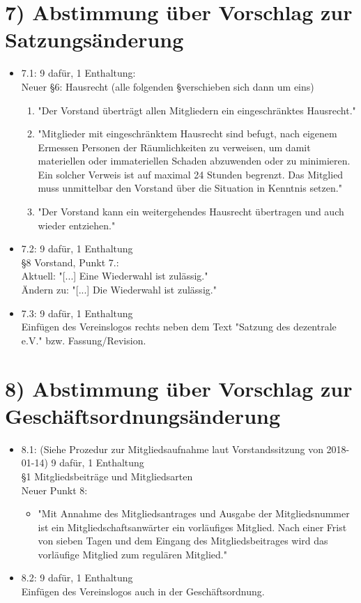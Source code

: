 \documentclass[10pt,a4paper]{scrartcl}
\begin{document}
\section*{7) Abstimmung {\"u}ber Vorschlag zur Satzungs{\"a}nderung}
    	\begin{itemize}
    		\item 7.1: 9 daf{\"u}r, 1 Enthaltung:\\
			Neuer \S6: Hausrecht (alle folgenden \S verschieben sich
			dann um eins)
		    	\begin{enumerate}
				\item "Der Vorstand übertr{\"a}gt allen Mitgliedern ein
					eingeschr{\"a}nktes Hausrecht."
				\item "Mitglieder mit eingeschr{\"a}nktem Hausrecht sind
					befugt, nach eigenem Ermessen Personen der
					R{\"a}umlichkeiten zu verweisen, um damit materiellen
					oder immateriellen Schaden abzuwenden oder zu
					minimieren. Ein solcher Verweis ist auf maximal 24
					Stunden begrenzt. Das Mitglied muss unmittelbar
					den Vorstand {\"u}ber die Situation in Kenntnis setzen."
				\item "Der Vorstand kann ein weitergehendes Hausrecht
					{\"u}bertragen und auch wieder entziehen."
			\end{enumerate}
    		\item 7.2: 9 daf{\"u}r, 1 Enthaltung\\
			\S8 Vorstand, Punkt 7.:\\
				Aktuell:   "[...] Eine Wiederwahl ist zul{\"a}ssig."\\
				{\"A}ndern zu: "[...] Die Wiederwahl ist zul{\"a}ssig."\\
    		\item 7.3: 9 daf{\"u}r, 1 Enthaltung\\
			Einf{\"u}gen des Vereinslogos rechts neben dem Text
			"Satzung des dezentrale e.V." bzw. Fassung/Revision.
	\end{itemize}

\section*{8) Abstimmung {\"u}ber Vorschlag zur Gesch{\"a}ftsordnungs{\"a}nderung}
	\begin{itemize}
        	\item 8.1: (Siehe Prozedur zur Mitgliedsaufnahme laut Vorstandssitzung von 2018-01-14) 9 daf{\"u}r, 1 Enthaltung\\
			\S1 Mitgliedsbeiträge und Mitgliedsarten\\
			Neuer Punkt 8:
			\begin{itemize}
				\item      "Mit Annahme des Mitgliedsantrages und Ausgabe der
					   Mitgliedsnummer ist ein Mitgliedschaftsanwärter ein
					   vorläufiges Mitglied. Nach einer Frist von sieben
					   Tagen und dem Eingang des Mitgliedsbeitrages wird das
					   vorläufige Mitglied zum regulären Mitglied."
			\end{itemize}
        	\item 8.2: 9 daf{\"u}r, 1 Enthaltung\\
			Einf{\"u}gen des Vereinslogos auch in der Gesch{\"a}ftsordnung.
	\end{itemize}
\end{document}
